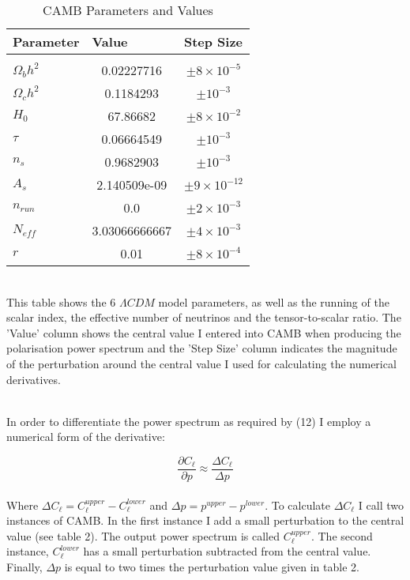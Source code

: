 \begin{table}[h]
\centering
\caption{CAMB Parameters and Values}
\label{my-label}
\begin{tabular}{l|l|l}
Parameter & Value & Step Size \\ \hline
& \multicolumn{1}{c|}{} & \multicolumn{1}{c}{} \\
$\Omega_{b}h^{2}$ & \multicolumn{1}{c|}{0.02227716} & \multicolumn{1}{c}{$\pm 8 \times 10^{-5}$} \\
$\Omega_{c}h^{2}$ & \multicolumn{1}{c|}{0.1184293} & \multicolumn{1}{c}{$\pm 10^{-3}$} \\
$H_0$ & \multicolumn{1}{c|}{67.86682} & \multicolumn{1}{c}{$\pm 8 \times 10^{-2}$} \\
$\tau$ & \multicolumn{1}{c|}{0.06664549} & \multicolumn{1}{c}{$\pm 10^{-3}$} \\
$n_s$ & \multicolumn{1}{c|}{0.9682903} & \multicolumn{1}{c}{$\pm 10^{-3}$} \\
$A_s$ & \multicolumn{1}{c|}{2.140509e-09} & \multicolumn{1}{c}{$\pm 9 \times 10^{-12}$} \\
$n_{run}$ & \multicolumn{1}{c|}{0.0} & \multicolumn{1}{c}{$\pm 2 \times 10^{-3}$} \\
$N_{eff}$ & \multicolumn{1}{c|}{3.03066666667} & \multicolumn{1}{c}{$\pm 4 \times 10^{-3}$} \\
$r$ & \multicolumn{1}{c|}{0.01} & \multicolumn{1}{c}{$\pm 8 \times 10^{-4}$} \\
\end{tabular}
\bigskip
\\This table shows the 6 $\Lambda CDM$ model parameters, as well as the running of the scalar index, the effective number of neutrinos and the tensor-to-scalar ratio. The 'Value' column shows the central value I entered into CAMB when producing the polarisation power spectrum and the 'Step Size' column indicates the magnitude of the perturbation around the central value I used for calculating the numerical derivatives.
\end{table}
\\

In order to differentiate the power spectrum as required by (12) I employ a numerical form of the derivative:

\begin{equation}
\frac{\partial C_{\ell}}{\partial p} \approx \frac{\Delta C_{\ell}}{\Delta p}
\end{equation}
\\
Where $\Delta C_{\ell} = C^{upper}_{\ell} - C^{lower}_{\ell}$ and $\Delta p = p^{upper} - p^{lower}$. To calculate $\Delta C_{\ell}$ I call two instances of CAMB. In the first instance I add a small perturbation to the central value (see table 2). The output power spectrum is called $C^{upper}_{\ell}$. The second instance, $C^{lower}_{\ell}$ has a small perturbation subtracted from the central value. Finally, $\Delta p$ is equal to two times the perturbation value given in table 2.

